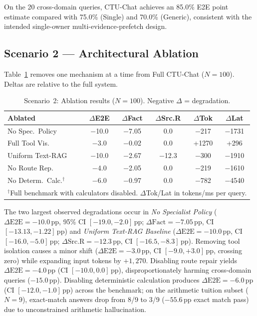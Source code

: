 On the 20 cross-domain queries, CTU-Chat achieves an 85.0\% E2E point estimate compared with 75.0\% (Single) and 70.0\% (Generic), consistent with the intended single-owner multi-evidence-prefetch design.

\subsection{Scenario 2 --- Architectural Ablation}
\label{sec:s2_results}

Table~\ref{tab:ablation} removes one mechanism at a time from Full CTU-Chat ($N{=}100$). Deltas are relative to the full system.

\begin{table}[!htbp]
\centering
\caption{Scenario~2: Ablation results ($N=100$). Negative $\Delta$ = degradation.}
\label{tab:ablation}
{\small\setlength{\tabcolsep}{3.5pt}
\begin{tabular}{lccccc}
\toprule
\textbf{Ablated} & \textbf{$\Delta$E2E} & \textbf{$\Delta$Fact} & \textbf{$\Delta$Src.R} & \textbf{$\Delta$Tok} & \textbf{$\Delta$Lat} \\
\midrule
No Spec.~Policy  & $-$10.0 & $-$7.05 & 0.0  & $-$217  & $-$1731 \\
Full Tool Vis.   & $-$3.0  & $-$0.02 & 0.0  & +1270   & +296 \\
Uniform Text-RAG & $-$10.0 & $-$2.67 & $-$12.3 & $-$300  & $-$1910 \\
No Route Rep.    & $-$4.0  & $-$2.05 & 0.0  & $-$219  & $-$1610 \\
No Determ.~Calc.$^\dagger$ & $-$6.0 & $-$0.97 & 0.0 & $-$782 & $-$4540 \\
\bottomrule
\multicolumn{6}{l}{\rule{0pt}{2.5ex}\footnotesize $^\dagger$Full benchmark with calculators disabled. $\Delta$Tok/Lat in tokens/ms per query.}
\end{tabular}}
\end{table}

The two largest observed degradations occur in \emph{No Specialist Policy} ($\Delta\text{E2E} = -10.0$\,pp, 95\% CI $[-19.0, -2.0]$\,pp; $\Delta\text{Fact} = -7.05$\,pp, CI $[-13.13, -1.22]$\,pp) and \emph{Uniform Text-RAG Baseline} ($\Delta\text{E2E} = -10.0$\,pp, CI $[-16.0, -5.0]$\,pp; $\Delta\text{Src.R} = -12.3$\,pp, CI $[-16.5, -8.3]$\,pp). Removing tool isolation causes a minor shift ($\Delta\text{E2E} = -3.0$\,pp, CI $[-9.0, +3.0]$\,pp, crossing zero) while expanding input tokens by $+1{,}270$. Disabling route repair yields $\Delta\text{E2E} = -4.0$\,pp (CI $[-10.0, 0.0]$\,pp), disproportionately harming cross-domain queries ($-15.0$\,pp). Disabling deterministic calculation produces $\Delta\text{E2E} = -6.0$\,pp (CI $[-12.0, -1.0]$\,pp) across the benchmark; on the arithmetic tuition subset ($N{=}9$), exact-match answers drop from 8/9 to 3/9 ($-55.6$\,pp exact match pass) due to unconstrained arithmetic hallucination.

